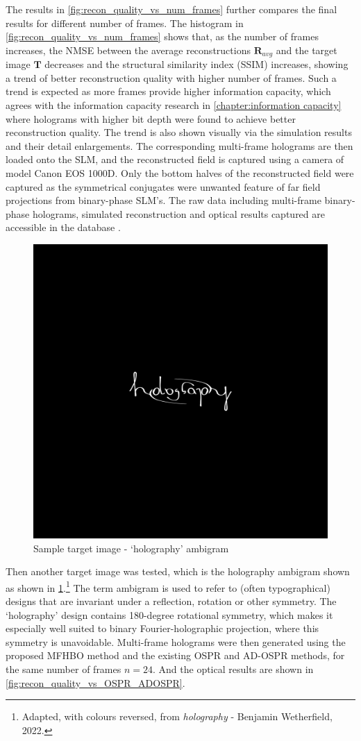 	The results in \cref{fig:recon_quality_vs_num_frames} further compares the final results for different number of frames. The histogram in \cref{fig:recon_quality_vs_num_frames} shows that, as the number of frames increases, the NMSE between the average reconstructions $\textbf{R}_{avg}$ and the target image $\textbf{T}$ decreases and the structural similarity index (SSIM)\cite{Wang2004_SSIM} increases, showing a trend of better reconstruction quality with higher number of frames. Such a trend is expected as more frames provide higher information capacity, which agrees with the information capacity research in \cref{chapter:information capacity} where holograms with higher bit depth were found to achieve better reconstruction quality. The trend is also shown visually via the simulation results and their detail enlargements. The corresponding multi-frame holograms are then loaded onto the SLM, and the reconstructed field is captured using a camera of model Canon EOS 1000D. Only the bottom halves of the reconstructed field were captured as the symmetrical conjugates were unwanted feature of far field projections from binary-phase SLM's. The raw data including multi-frame binary-phase holograms, simulated reconstruction and optical results captured are accessible in the database \cite{research_data_MFHO2024}.

	\begin{figure}[H]
		\centering
		\includegraphics[width=0.5\linewidth]{holography_ambigram_smaller.png}
		\caption{Sample target image - `holography' ambigram}
		\label{fig:holography_ambigram_smaller}
	\end{figure}

	Then another target image was tested, which is the holography ambigram shown  as shown in \cref{fig:holography_ambigram_smaller}.\footnote{Adapted, with colours reversed, from  \emph{holography} - Benjamin Wetherfield, 2022.} The term ambigram is used to refer to (often typographical) designs that are invariant under a reflection, rotation or other symmetry. The `holography' design contains 180-degree rotational symmetry, which makes it especially well suited to binary Fourier-holographic projection, where this symmetry is unavoidable. Multi-frame holograms were then generated using the proposed MFHBO method and the existing OSPR and AD-OSPR methods, for the same number of frames $n=24$. And the optical results are shown in \cref{fig:recon_quality_vs_OSPR_ADOSPR}.

